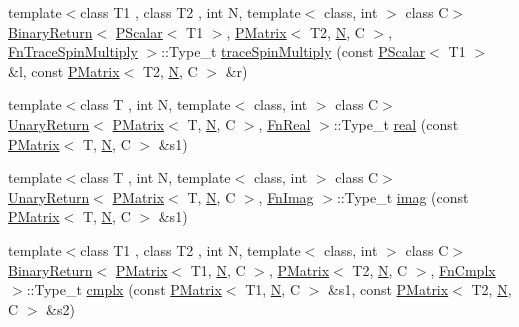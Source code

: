 \begin{DoxyCompactItemize}
\item 
{\footnotesize template$<$class T1 , class T2 , int N, template$<$ class, int $>$ class C$>$ }\\\mbox{\hyperlink{structENSEM_1_1BinaryReturn}{Binary\+Return}}$<$ \mbox{\hyperlink{classENSEM_1_1PScalar}{P\+Scalar}}$<$ T1 $>$, \mbox{\hyperlink{classENSEM_1_1PMatrix}{P\+Matrix}}$<$ T2, \mbox{\hyperlink{operator__name__util_8cc_a7722c8ecbb62d99aee7ce68b1752f337}{N}}, C $>$, \mbox{\hyperlink{structENSEM_1_1FnTraceSpinMultiply}{Fn\+Trace\+Spin\+Multiply}} $>$\+::Type\+\_\+t \mbox{\hyperlink{group__primmatrix_gafb9febbc048f38bb6e1dc7d60d8dde8d}{trace\+Spin\+Multiply}} (const \mbox{\hyperlink{classENSEM_1_1PScalar}{P\+Scalar}}$<$ T1 $>$ \&l, const \mbox{\hyperlink{classENSEM_1_1PMatrix}{P\+Matrix}}$<$ T2, \mbox{\hyperlink{operator__name__util_8cc_a7722c8ecbb62d99aee7ce68b1752f337}{N}}, C $>$ \&r)
\item 
{\footnotesize template$<$class T , int N, template$<$ class, int $>$ class C$>$ }\\\mbox{\hyperlink{structENSEM_1_1UnaryReturn}{Unary\+Return}}$<$ \mbox{\hyperlink{classENSEM_1_1PMatrix}{P\+Matrix}}$<$ T, \mbox{\hyperlink{operator__name__util_8cc_a7722c8ecbb62d99aee7ce68b1752f337}{N}}, C $>$, \mbox{\hyperlink{structENSEM_1_1FnReal}{Fn\+Real}} $>$\+::Type\+\_\+t \mbox{\hyperlink{group__primmatrix_ga5d6f44c46b47f8dc972b40a518058e0e}{real}} (const \mbox{\hyperlink{classENSEM_1_1PMatrix}{P\+Matrix}}$<$ T, \mbox{\hyperlink{operator__name__util_8cc_a7722c8ecbb62d99aee7ce68b1752f337}{N}}, C $>$ \&s1)
\item 
{\footnotesize template$<$class T , int N, template$<$ class, int $>$ class C$>$ }\\\mbox{\hyperlink{structENSEM_1_1UnaryReturn}{Unary\+Return}}$<$ \mbox{\hyperlink{classENSEM_1_1PMatrix}{P\+Matrix}}$<$ T, \mbox{\hyperlink{operator__name__util_8cc_a7722c8ecbb62d99aee7ce68b1752f337}{N}}, C $>$, \mbox{\hyperlink{structENSEM_1_1FnImag}{Fn\+Imag}} $>$\+::Type\+\_\+t \mbox{\hyperlink{group__primmatrix_ga0e708a122654c3ad8295f071a5857abb}{imag}} (const \mbox{\hyperlink{classENSEM_1_1PMatrix}{P\+Matrix}}$<$ T, \mbox{\hyperlink{operator__name__util_8cc_a7722c8ecbb62d99aee7ce68b1752f337}{N}}, C $>$ \&s1)
\item 
{\footnotesize template$<$class T1 , class T2 , int N, template$<$ class, int $>$ class C$>$ }\\\mbox{\hyperlink{structENSEM_1_1BinaryReturn}{Binary\+Return}}$<$ \mbox{\hyperlink{classENSEM_1_1PMatrix}{P\+Matrix}}$<$ T1, \mbox{\hyperlink{operator__name__util_8cc_a7722c8ecbb62d99aee7ce68b1752f337}{N}}, C $>$, \mbox{\hyperlink{classENSEM_1_1PMatrix}{P\+Matrix}}$<$ T2, \mbox{\hyperlink{operator__name__util_8cc_a7722c8ecbb62d99aee7ce68b1752f337}{N}}, C $>$, \mbox{\hyperlink{structENSEM_1_1FnCmplx}{Fn\+Cmplx}} $>$\+::Type\+\_\+t \mbox{\hyperlink{group__primmatrix_ga895c61e14c8d4206a949f44e36add5c6}{cmplx}} (const \mbox{\hyperlink{classENSEM_1_1PMatrix}{P\+Matrix}}$<$ T1, \mbox{\hyperlink{operator__name__util_8cc_a7722c8ecbb62d99aee7ce68b1752f337}{N}}, C $>$ \&s1, const \mbox{\hyperlink{classENSEM_1_1PMatrix}{P\+Matrix}}$<$ T2, \mbox{\hyperlink{operator__name__util_8cc_a7722c8ecbb62d99aee7ce68b1752f337}{N}}, C $>$ \&s2)

\end{DoxyCompactItemize}

